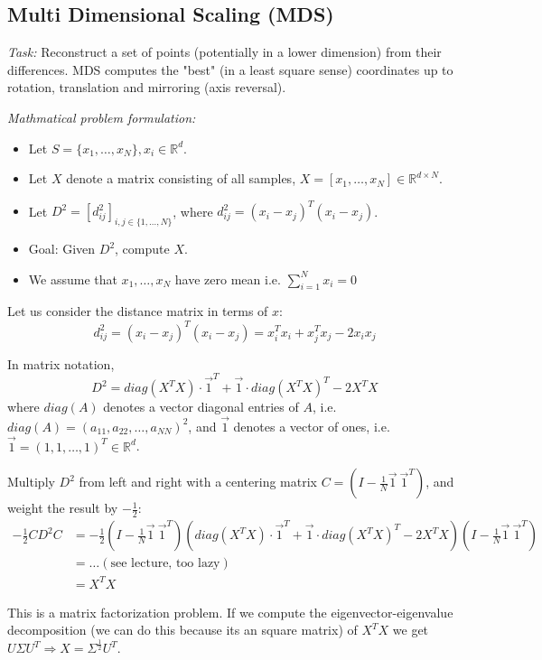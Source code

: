 
\subsection*{Multi Dimensional Scaling (MDS)}

\textit{Task:} Reconstruct a set of points (potentially in a lower dimension) from their differences. MDS computes the "best" (in a least square sense) coordinates up to rotation, translation and mirroring (axis reversal).

\textit{Mathmatical problem formulation:}
\begin{itemize}
    \item
        Let \(S = \{x_1, \dots, x_N\}, x_i \in \mathbb{R}^d\).
    \item
        Let \(X\) denote a matrix consisting of all samples, \(X=[x_1, \dots, x_N] \in \mathbb{R}^{d \times N}\).
    \item
        Let \(D^2 = [d_{ij}^2]_{i, j \in \{1, \dots, N\}}\), where \(d_{ij}^2 = (x_i - x_j)^T (x_i - x_j)\).
    \item
        Goal: Given \(D^2\), compute \(X\).
    \item
        We assume that \(x_1, \dots, x_N\) have zero mean i.e. \(\sum_{i=1}^N x_i = 0\)
\end{itemize}

Let us consider the distance matrix in terms of \(x\):
\[d_{ij}^2 = (x_i - x_j)^T(x_i - x_j)=x_i^T x_i + x_j^T x_j - 2 x_i x_j\]

In matrix notation,
\[D^2 = diag(X^T X) \cdot \vec{1}^T + \vec{1} \cdot diag(X^T X)^T - 2X^TX\]
where \(diag(A)\) denotes a vector diagonal entries of \(A\), i.e. \(diag(A) = (a_{11}, a_{22}, \dots, a_{NN})^2\), and \(\vec{1}\) denotes a vector of ones, i.e. \(\vec{1} = (1,1,\dots,1)^T \in \mathbb{R}^d\).

Multiply \(D^2\) from left and right with a centering matrix \(C = (I - \frac{1}{N} \vec{1} \ \vec{1}^T)\), and weight the result by \(-\frac{1}{2}\):
\begin{align*}
    -\frac{1}{2} C D^2 C &= -\frac{1}{2} (I- \frac{1}{N} \vec{1} \ \vec{1}^T) (diag(X^T X) \cdot \vec{1}^T + \vec{1} \cdot diag(X^T X)^T - 2X^TX)(I- \frac{1}{N} \vec{1} \ \vec{1}^T)\\
    &= \dots (\text{see lecture, too lazy}) \\
    &= X^T X
\end{align*}

This is a matrix factorization problem. If we compute the eigenvector-eigenvalue decomposition (we can do this because its an square matrix) of \(X^T X\) we get \(U \Sigma U^T \Rightarrow X = \Sigma^{\frac{1}{2}} U^T\).

